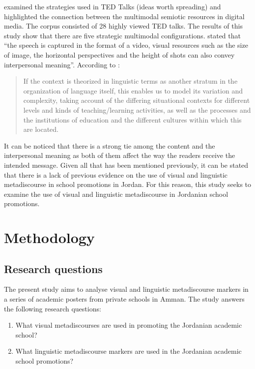 \documentclass[english]{textolivre}
\begin{document}
\textcite{xia_engaging_2021} examined the strategies used in TED Talks (ideas worth spreading) and highlighted the connection between the multimodal semiotic resources in digital media. The corpus consisted of 28 highly viewed TED talks. The results of this study show that there are five strategic multimodal configurations. \textcite[p.~52]{xia_engaging_2021} stated that “the speech is captured in the format of a video, visual resources such as the size of image, the horizontal perspectives and the height of shots can also convey interpersonal meaning”. According to \textcite[p.~1]{halliday_language_1978}:

\begin{quote}
    If the context is theorized in linguistic terms as another stratum in the organization of language itself, this enables us to model its variation and complexity, taking account of the differing situational contexts for different levels and kinds of teaching/learning activities, as well as the processes and the institutions of education and the different cultures within which this are located.
\end{quote}

It can be noticed that there is a strong tie among the content and the interpersonal meaning as both of them affect the way the readers receive the intended message. Given all that has been mentioned previously, it can be stated that there is a lack of previous evidence on the use of visual and linguistic metadiscourse in school promotions in Jordan. For this reason, this study seeks to examine the use of visual and linguistic metadiscourse in Jordanian school promotions.

\section{Methodology}\label{sec-conduta}
\subsection{Research questions}
The present study aims to analyse visual and linguistic metadiscourse markers in a series of academic posters from private schools in Amman. The study answers the following research questions:

\begin{enumerate}
    \item What visual metadiscourses are used in promoting the Jordanian academic school?
    \item What linguistic metadiscourse markers are used in the Jordanian academic school promotions?
\end{enumerate}
\end{document}
